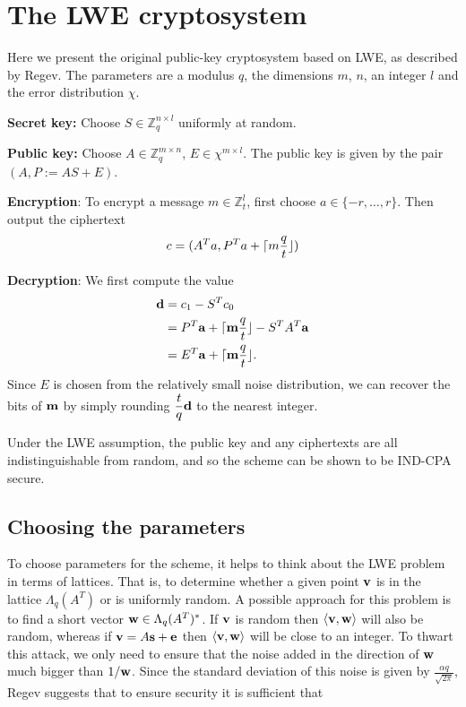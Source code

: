 \documentclass[11pt]{article}
\begin{document}
\section{The LWE cryptosystem}

Here we present the original public-key cryptosystem based on LWE, as described
by Regev. The parameters are a modulus $q$, the dimensions $m$, $n$, an integer
$l$ and the error distribution $\chi$.

\noindent\textbf{Secret key:} Choose $S \in \mathbb{Z}_q^{n \times l}$ uniformly at
random.

\noindent\textbf{Public key:} Choose $A \in \mathbb{Z}_q^{m \times n}$, $E \in \chi^{m \times l}$.
The public key is given by the pair $(A, P := AS + E)$.

\noindent\textbf{Encryption}:
To encrypt a message $m \in \mathbb{Z}_t^l$, first choose $a \in \{-r, \dots, r\}$.
Then output the ciphertext
\[ c = (A^Ta, P^Ta + \lceil  m \frac{q}{t} \rfloor) \]

\noindent\textbf{Decryption}: We first compute the value
\begin{align*}
\mathbf{d} &= c_1 - S^Tc_0 \\
       &= P^T\mathbf{a} + \lceil  \mathbf{m} \frac{q}{t}  \rfloor - S^TA^T\mathbf{a} \\
       &= E^T\mathbf{a} + \lceil  \mathbf{m} \frac{q}{t}  \rfloor.
\end{align*}
%
Since $E$ is chosen from the relatively small
noise distribution, we can recover the bits of $\mathbf{m}$ by simply rounding $\displaystyle\frac{t}{q}\mathbf{d}$ to the
nearest integer.

Under the LWE assumption, the public key and any ciphertexts are all indistinguishable from random,
and so the scheme can be shown to be IND-CPA secure.


\subsection{Choosing the parameters}
To choose parameters for the scheme, it helps to think about the LWE problem
in terms of lattices. That is, to determine whether a given point $\mathbf{v}$ is in the lattice
$\Lambda_q(A^T)$ or is uniformly random. A possible approach for this problem
is to find a short vector $\mathbf{w} \in \Lambda_q(A^T)^*$. If $\mathbf{v}$ is random then
$\langle \mathbf{v}, \mathbf{w} \rangle$ will also be random, whereas if
$\mathbf{v} = A\mathbf{s} + \mathbf{e}$ then $\langle \mathbf{v}, \mathbf{w} \rangle$ will be
close to an integer. To thwart this attack, we only need to ensure that the
noise added in the direction of $\mathbf{w}$ much bigger than $1/\mathbf{w}$.
Since the standard deviation of this noise is given by $\displaystyle\frac{\alpha q}{\sqrt{2\pi}}$,
Regev suggests that to ensure security it is sufficient that
\end{document}
